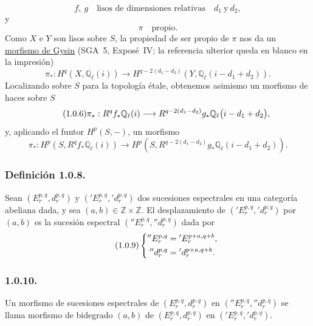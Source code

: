 \begin{equation}\tag{1.0.3}
f,\ g\quad\text{lisos de dimensiones relativas}\quad d_1\ \text{y}\ d_2,
\end{equation}
y
\begin{equation}\tag{1.0.4}
\pi\quad\text{propio}.
\end{equation}
Como $X$ e $Y$ son lisos sobre $S$, la propiedad de ser propio de $\pi$
nos da un \underline{morfismo de Gysin} (SGA~5, Exposé~IV; la referencia
ulterior queda en blanco en la impresión)
\begin{equation}\tag{1.0.5}
\pi_*:H^q(X,\mathbb Q_\ell(i))\longrightarrow
H^{q-2(d_1-d_2)}(Y,\mathbb Q_\ell(i-d_1+d_2)).
\end{equation}
Localizando sobre $S$ para la topología étale, obtenemos asimismo un
morfismo de haces sobre $S$
\begin{equation}\tag{1.0.6}
\pi_*:R^qf_*\mathbb Q_\ell(i)\longrightarrow
R^{q-2(d_1-d_2)}g_*
 \mathbb Q_\ell\bigl(\sisi{i-d_1-d_2}{i-d_1+d_2}\bigr),
\end{equation}
y, aplicando el funtor $H^p(S,-)$, un morfismo
\begin{equation}\tag{1.0.7}
\pi_*:H^p(S,R^qf_*\mathbb Q_\ell(i))\longrightarrow
H^p(S,R^{q-2(d_1-d_2)}g_*\mathbb Q_\ell(i-d_1+d_2)).
\end{equation}

\subsubsection*{Definición 1.0.8.}
Sean $(E_r^{p,q},d_r^{p,q})$ y
$({}'E_r^{p,q},{}'d_r^{p,q})$ dos sucesiones espectrales en una categoría
abeliana dada, y sea $(a,b)\in\mathbb Z\times\mathbb Z$. El desplazamiento
de $({}'E_r^{p,q},{}'d_r^{p,q})$ por $(a,b)$ es la sucesión espectral
$({}''E_r^{p,q},{}''d_r^{p,q})$ dada por
\begin{equation}\tag{1.0.9}
\left\{
\begin{aligned}
{}''E_r^{p,q}&={}'E_r^{p+a,q+b},\\
{}''d_r^{p,q}&=\sisi{d_r^{p+a,q+b}}{{}'d_r^{p+a,q+b}}.
\end{aligned}
\right.
\end{equation}

\pageoriginale

\subsubsection*{1.0.10.}
Un morfismo de sucesiones espectrales de
$(E_r^{p,q},d_r^{p,q})$ en $({}''E_r^{p,q},{}''d_r^{p,q})$ se llama
morfismo de bidegrado $(a,b)$ de $(E_r^{p,q},d_r^{p,q})$ en
$({}'E_r^{p,q},{}'d_r^{p,q})$.

